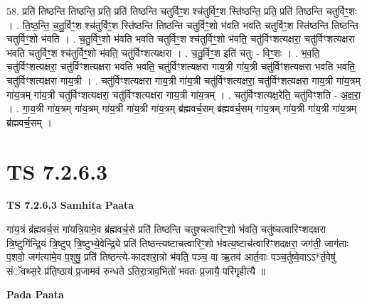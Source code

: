 \documentclass[17pt]{extarticle}
\begin{document}
58. प्रति॑ तिष्ठन्ति तिष्ठन्ति॒ प्रति॒ प्रति॑ तिष्ठन्ति चतुर्विꣳ॒॒श श्च॑तुर्विꣳ॒॒श स्ति॑ष्ठन्ति॒ प्रति॒ प्रति॑ तिष्ठन्ति चतुर्विꣳ॒॒शः । . ति॒ष्ठ॒न्ति॒ च॒तु॒र्विꣳ॒॒श श्च॑तुर्विꣳ॒॒श स्ति॑ष्ठन्ति तिष्ठन्ति चतुर्विꣳ॒॒शो भ॑वति भवति चतुर्विꣳ॒॒श स्ति॑ष्ठन्ति तिष्ठन्ति चतुर्विꣳ॒॒शो भ॑वति । . च॒तु॒र्विꣳ॒॒शो भ॑वति भवति चतुर्विꣳ॒॒श श्च॑तुर्विꣳ॒॒शो भ॑वति॒ चतु॑र्विꣳशत्यक्षरा॒ चतु॑र्विꣳशत्यक्षरा भवति चतुर्विꣳ॒॒श श्च॑तुर्विꣳ॒॒शो भ॑वति॒ चतु॑र्विꣳशत्यक्षरा । . च॒तु॒र्विꣳ॒॒श इति॑ चतुः - विꣳ॒॒शः । . भ॒व॒ति॒ चतु॑र्विꣳशत्यक्षरा॒ चतु॑र्विꣳशत्यक्षरा भवति भवति॒ चतु॑र्विꣳशत्यक्षरा गाय॒त्री गा॑य॒त्री चतु॑र्विꣳशत्यक्षरा भवति भवति॒ चतु॑र्विꣳशत्यक्षरा गाय॒त्री । . चतु॑र्विꣳशत्यक्षरा गाय॒त्री गा॑य॒त्री चतु॑र्विꣳशत्यक्षरा॒ चतु॑र्विꣳशत्यक्षरा गाय॒त्री गा॑य॒त्रम् गा॑य॒त्रम् गा॑य॒त्री चतु॑र्विꣳशत्यक्षरा॒ चतु॑र्विꣳशत्यक्षरा गाय॒त्री गा॑य॒त्रम् । . चतु॑र्विꣳशत्यक्ष॒रेति॒ चतु॑विꣳशति - अ॒क्ष॒रा॒ । . गा॒य॒त्री गा॑य॒त्रम् गा॑य॒त्रम् गा॑य॒त्री गा॑य॒त्री गा॑य॒त्रम् ब्र॑ह्मवर्च॒सम् ब्र॑ह्मवर्च॒सम् गा॑य॒त्रम् गा॑य॒त्री गा॑य॒त्री गा॑य॒त्रम् ब्र॑ह्मवर्च॒सम् । \newline
\pagebreak
{}

\section{ TS 7.2.6.3 }

\textbf{TS 7.2.6.3 } \newline
\textbf{Samhita Paata} \newline

गा॑य॒त्रं ब्र॑ह्मवर्च॒सं गा॑यत्रि॒यामे॒व ब्र॑ह्मवर्च॒से प्रति॑ तिष्ठन्ति चतुश्चत्वारिꣳ॒॒शो भ॑वति॒ चतु॑ष्चत्वारिꣳशदक्षरा त्रि॒ष्टुगि॑न्द्रि॒यं त्रि॒ष्टुप् त्रि॒ष्टुभ्ये॒वेन्द्रि॒ये प्रति॑ तिष्ठन्त्यष्टाचत्वारिꣳ॒॒शो भ॑वत्य॒ष्टाच॑त्वारिꣳशदक्षरा॒ जग॑ती॒ जाग॑ताः प॒शवो॒ जग॑त्यामे॒व प॒शुषु॒ प्रति॑ तिष्ठन्त्ये-कादशरा॒त्रो भ॑वति॒ पञ्च॒ वा ऋ॒तव॑ आर्त॒वाः पञ्च॒र्तुष्वे॒वाऽऽ*र्त॒वेषु॑ संॅवथ्स॒रे प्र॑ति॒ष्ठाय॑ प्र॒जामव॑ रुन्धते ऽतिरा॒त्राव॒भितो॑ भवतः प्र॒जायै॒ परि॑गृहीत्यै ॥ \newline

\textbf{Pada Paata} \newline
\end{document}
